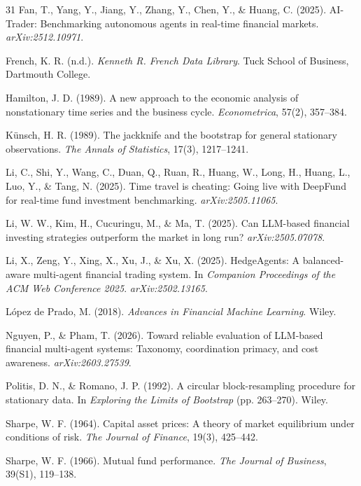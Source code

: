 \documentclass{article}
\begin{document}
\begin{thebibliography}{31}
 Fan, T., Yang, Y., Jiang, Y., Zhang, Y., Chen, Y., \& Huang, C. (2025). AI-Trader: Benchmarking autonomous agents in real-time financial markets. \textit{arXiv:2512.10971}.

 French, K. R. (n.d.). \textit{Kenneth R. French Data Library}. Tuck School of Business, Dartmouth College.

 Hamilton, J. D. (1989). A new approach to the economic analysis of nonstationary time series and the business cycle. \textit{Econometrica}, 57(2), 357--384.

 K\"{u}nsch, H. R. (1989). The jackknife and the bootstrap for general stationary observations. \textit{The Annals of Statistics}, 17(3), 1217--1241.

 Li, C., Shi, Y., Wang, C., Duan, Q., Ruan, R., Huang, W., Long, H., Huang, L., Luo, Y., \& Tang, N. (2025). Time travel is cheating: Going live with DeepFund for real-time fund investment benchmarking. \textit{arXiv:2505.11065}.

 Li, W. W., Kim, H., Cucuringu, M., \& Ma, T. (2025). Can LLM-based financial investing strategies outperform the market in long run? \textit{arXiv:2505.07078}.

 Li, X., Zeng, Y., Xing, X., Xu, J., \& Xu, X. (2025). HedgeAgents: A balanced-aware multi-agent financial trading system. In \textit{Companion Proceedings of the ACM Web Conference 2025}. \textit{arXiv:2502.13165}.

 L\'{o}pez de Prado, M. (2018). \textit{Advances in Financial Machine Learning}. Wiley.

 Nguyen, P., \& Pham, T. (2026). Toward reliable evaluation of LLM-based financial multi-agent systems: Taxonomy, coordination primacy, and cost awareness. \textit{arXiv:2603.27539}.

 Politis, D. N., \& Romano, J. P. (1992). A circular block-resampling procedure for stationary data. In \textit{Exploring the Limits of Bootstrap} (pp. 263--270). Wiley.

 Sharpe, W. F. (1964). Capital asset prices: A theory of market equilibrium under conditions of risk. \textit{The Journal of Finance}, 19(3), 425--442.

 Sharpe, W. F. (1966). Mutual fund performance. \textit{The Journal of Business}, 39(S1), 119--138.


\end{thebibliography}
\end{document}
